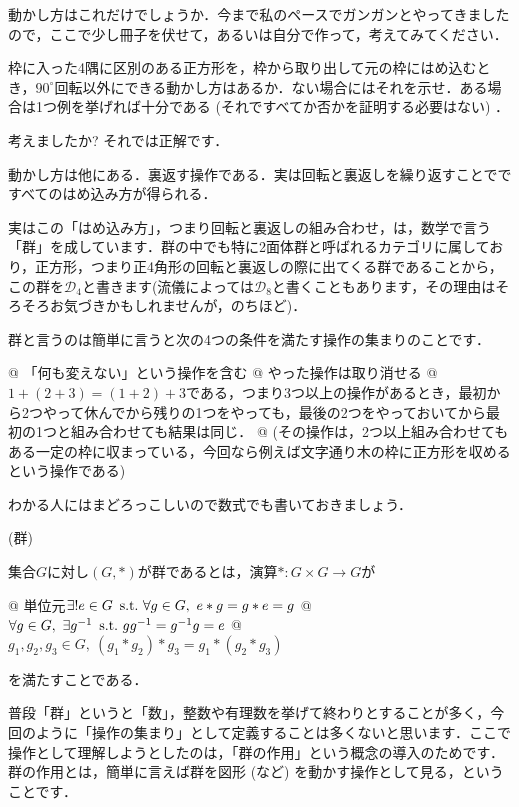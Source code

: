 \documentclass[11pt]{jsarticle}
\begin{document}
動かし方はこれだけでしょうか．今まで私のペースでガンガンとやってきましたので，ここで少し冊子を伏せて，あるいは自分で作って，考えてみてください．
\begin{screen}
  \begin{prob}
    枠に入った4隅に区別のある正方形を，枠から取り出して元の枠にはめ込むとき，$90^\circ$回転以外にできる動かし方はあるか．ない場合にはそれを示せ．ある場合は1つ例を挙げれば十分である (それですべてか否かを証明する必要はない) ．
  \end{prob}
\end{screen}
考えましたか? それでは正解です．
\begin{ans*}
  動かし方は他にある．裏返す操作である．実は回転と裏返しを繰り返すことでですべてのはめ込み方が得られる．
\end{ans*}

実はこの「はめ込み方」，つまり回転と裏返しの組み合わせ，は，数学で言う「群」を成しています．群の中でも特に2面体群と呼ばれるカテゴリに属しており，正方形，つまり正4角形の回転と裏返しの際に出てくる群であることから，この群を$\mathcal{D}_4$と書きます(流儀によっては$\mathcal{D}_8$と書くこともあります，その理由はそろそろお気づきかもしれませんが，のちほど)．

群と言うのは簡単に言うと次の4つの条件を満たす操作の集まりのことです．
\begin{easylist}[enumerate]
  @ 「何も変えない」という操作を含む
  @ やった操作は取り消せる
  @ $1 + (2 + 3) = (1 + 2) + 3 $である，つまり3つ以上の操作があるとき，最初から2つやって休んでから残りの1つをやっても，最後の2つをやっておいてから最初の1つと組み合わせても結果は同じ．
  @ (その操作は，2つ以上組み合わせてもある一定の枠に収まっている，今回なら例えば文字通り木の枠に正方形を収めるという操作である)
\end{easylist}
わかる人にはまどろっこしいので数式でも書いておきましょう．
\begin{defi}(群)
  
  集合$G$に対し$(G,*)$が群であるとは，演算$*\colon G\times G\to G$が
  \begin{easylist}[itemize]
    @ 単位元$\exists ! e\in G\operatorname{\ \text{s.t.}\,} \forall g\in G,\ e*g = g*e = g$
    @ $\forall g\in G,\ \exists \inv{g}\st g\inv{g} = \inv{g}g = e $
    @ $g_1,g_2,g_3\in G,\ (g_1*g_2)*g_3 = g_1*(g_2*g_3)$
  \end{easylist}
  を満たすことである．
\end{defi}

普段「群」というと「数」，整数や有理数を挙げて終わりとすることが多く，今回のように「操作の集まり」として定義することは多くないと思います．ここで操作として理解しようとしたのは，「群の作用」という概念の導入のためです．群の作用とは，簡単に言えば群を図形 (など) を動かす操作として見る，ということです．
\end{document}
